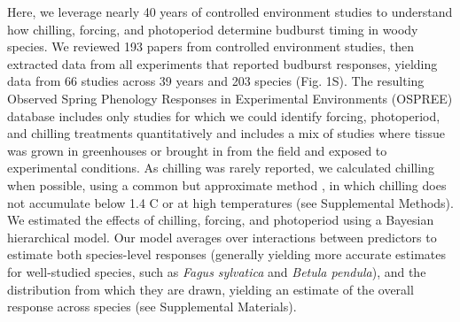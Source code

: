 \documentclass{article}
\begin{document}

\par Here, we leverage nearly 40 years of controlled environment studies to understand how chilling, forcing, and photoperiod determine budburst timing in woody species. %
We reviewed 193 papers from controlled environment studies, then extracted data from all experiments that reported budburst responses, yielding data from 66 studies across 39 years and 203 species (Fig. 1S). The resulting Observed Spring Phenology Responses in Experimental Environments (OSPREE) database includes only studies for which we could identify forcing, photoperiod, and chilling treatments quantitatively and includes a mix of studies where tissue was grown in greenhouses or brought in from the field and exposed to experimental conditions. As chilling was rarely reported, we calculated chilling when possible, using a common but approximate method \citep{richardson1974}, in which chilling does not accumulate below 1.4 \degree C or at high temperatures (see Supplemental Methods). We estimated the effects of chilling, forcing, and photoperiod using a Bayesian hierarchical model. Our model averages over interactions between predictors to estimate both species-level responses (generally yielding more accurate estimates for well-studied species, such as \emph{Fagus sylvatica} and \emph{Betula pendula}), and the distribution from which they are drawn, yielding an estimate of the overall response across species (see Supplemental Materials).
\end{document}
